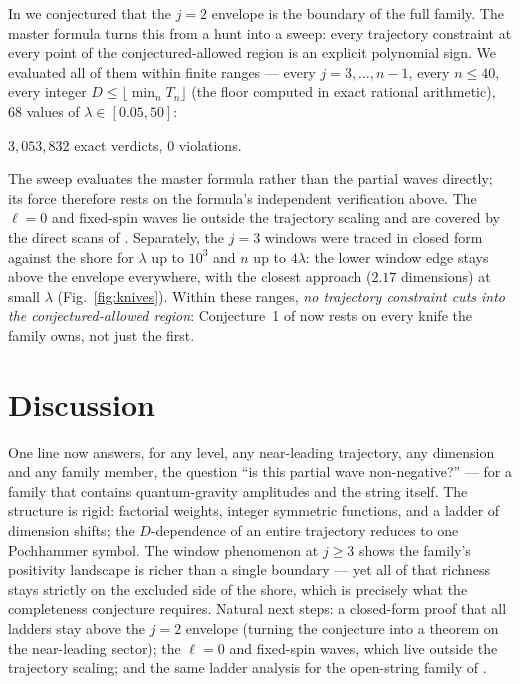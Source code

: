 \documentclass[11pt]{article}
\begin{document}
In \cite{shore} we conjectured that the $j{=}2$ envelope is the boundary of
the full family. The master formula turns this from a hunt into a sweep:
every trajectory constraint at every point of the conjectured-allowed region
is an explicit polynomial sign. We evaluated all of them within finite
ranges --- every $j=3,\dots,n-1$, every $n\le40$, every integer
$D\le\lfloor\min_nT_n\rfloor$ (the floor computed in exact rational
arithmetic), $68$ values of $\lambda\in[0.05,50]$:
\begin{center}
$3{,}053{,}832$ exact verdicts, \quad $0$ violations.
\end{center}
The sweep evaluates the master formula rather than the partial waves
directly; its force therefore rests on the formula's independent
verification above. The $\ell=0$ and fixed-spin waves lie outside the
trajectory scaling and are covered by the direct scans of \cite{shore}.
Separately, the $j{=}3$ windows were traced in closed form against the shore
for $\lambda$ up to $10^3$ and $n$ up to $4\lambda$: the lower window edge
stays above the envelope everywhere, with the closest approach ($2.17$
dimensions) at small $\lambda$ (Fig.~\ref{fig:knives}). Within these ranges,
\emph{no trajectory constraint cuts into the conjectured-allowed region}:
Conjecture~1 of \cite{shore} now rests on every knife the family owns, not
just the first.

\section{Discussion}
One line now answers, for any level, any near-leading trajectory, any
dimension and any family member, the question ``is this partial wave
non-negative?'' --- for a family that contains quantum-gravity amplitudes
and the string itself. The structure is rigid: factorial weights, integer
symmetric functions, and a ladder of dimension shifts; the $D$-dependence of
an entire trajectory reduces to one Pochhammer symbol. The window phenomenon
at $j\ge3$ shows the family's positivity landscape is richer than a single
boundary --- yet all of that richness stays strictly on the excluded side of
the shore, which is precisely what the completeness conjecture requires.
Natural next steps: a closed-form proof that all ladders stay above the
$j{=}2$ envelope (turning the conjecture into a theorem on the near-leading
sector); the $\ell=0$ and fixed-spin waves, which live outside the
trajectory scaling; and the same ladder analysis for the open-string family
of \cite{island}.
\end{document}

